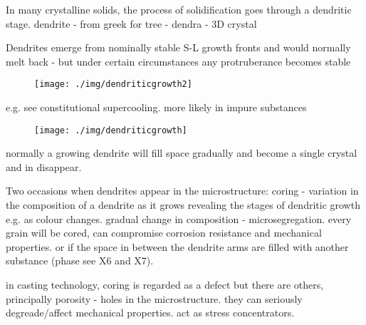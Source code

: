 In many crystalline solids, the process of solidification goes through a dendritic stage. dendrite - from greek for tree - dendra - 3D crystal
\begin{figure}[h]
  \centering
  \hfill
\end{figure}
Dendrites emerge from nominally stable S-L growth fronts and would normally melt back - but under certain circumstances any protruberance becomes stable
\begin{figure}
  \centering
  \texttt{[image: ./img/dendriticgrowth2]}
\end{figure}
e.g. see constitutional supercooling. more likely in impure substances
\begin{figure}[h!]
  \centering
  \texttt{[image: ./img/dendriticgrowth]}
\end{figure}
normally a growing dendrite will fill space gradually and become a single crystal and in disappear.

Two occasions when dendrites appear in the microstructure: coring - variation in the composition of a dendrite as it grows revealing the stages of dendritic growth e.g. as colour changes. gradual change in composition - microsegregation. every grain will be cored, can compromise corrosion resistance and mechanical properties. or if the space in between the dendrite arms are filled with another substance (phase see X6 and X7).

in casting technology, coring is regarded as a defect but there are others, principally porosity - holes in the microstructure. they can seriously degreade/affect mechanical properties. act as stress concentrators.